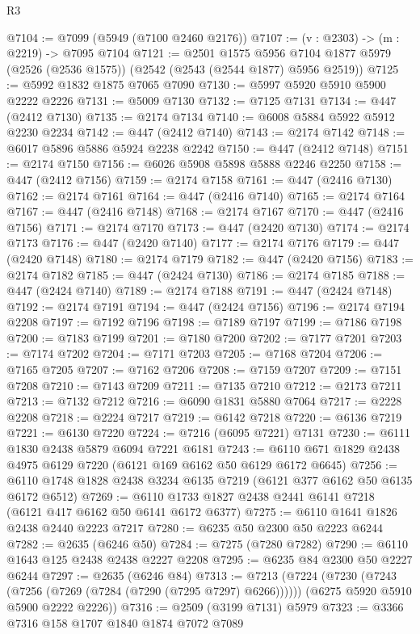 \begin{lexlean}{R3}
\begin{coremodule}
@7104 := @7099 (@5949 (@7100 @2460 @2176))
@7107 := (v : @2303) -> (m : @2219) -> @7095 @7104
@7121 := @2501
    @1575
    @5956
    @7104
    @1877
    @5979
    (@2526 (@2536 @1575))
    (@2542 (@2543 (@2544 @1877) @5956 @2519))
@7125 := @5992 @1832 @1875 @7065 @7090
@7130 := @5997 @5920 @5910 @5900 @2222 @2226
@7131 := @5009 @7130
@7132 := @7125 @7131
@7134 := @447 (@2412 @7130)
@7135 := @2174 @7134
@7140 := @6008 @5884 @5922 @5912 @2230 @2234
@7142 := @447 (@2412 @7140)
@7143 := @2174 @7142
@7148 := @6017 @5896 @5886 @5924 @2238 @2242
@7150 := @447 (@2412 @7148)
@7151 := @2174 @7150
@7156 := @6026 @5908 @5898 @5888 @2246 @2250
@7158 := @447 (@2412 @7156)
@7159 := @2174 @7158
@7161 := @447 (@2416 @7130)
@7162 := @2174 @7161
@7164 := @447 (@2416 @7140)
@7165 := @2174 @7164
@7167 := @447 (@2416 @7148)
@7168 := @2174 @7167
@7170 := @447 (@2416 @7156)
@7171 := @2174 @7170
@7173 := @447 (@2420 @7130)
@7174 := @2174 @7173
@7176 := @447 (@2420 @7140)
@7177 := @2174 @7176
@7179 := @447 (@2420 @7148)
@7180 := @2174 @7179
@7182 := @447 (@2420 @7156)
@7183 := @2174 @7182
@7185 := @447 (@2424 @7130)
@7186 := @2174 @7185
@7188 := @447 (@2424 @7140)
@7189 := @2174 @7188
@7191 := @447 (@2424 @7148)
@7192 := @2174 @7191
@7194 := @447 (@2424 @7156)
@7196 := @2174 @7194 @2208
@7197 := @7192 @7196
@7198 := @7189 @7197
@7199 := @7186 @7198
@7200 := @7183 @7199
@7201 := @7180 @7200
@7202 := @7177 @7201
@7203 := @7174 @7202
@7204 := @7171 @7203
@7205 := @7168 @7204
@7206 := @7165 @7205
@7207 := @7162 @7206
@7208 := @7159 @7207
@7209 := @7151 @7208
@7210 := @7143 @7209
@7211 := @7135 @7210
@7212 := @2173 @7211
@7213 := @7132 @7212
@7216 := @6090 @1831 @5880 @7064
@7217 := @2228 @2208
@7218 := @2224 @7217
@7219 := @6142 @7218
@7220 := @6136 @7219
@7221 := @6130 @7220
@7224 := @7216 (@6095 @7221) @7131
@7230 := @6111 @1830 @2438 @5879 @6094 @7221 @6181
@7243 := @6110 @671 @1829 @2438 @4975 @6129 @7220 (@6121 @169 @6162 @50 @6129 @6172 @6645)
@7256 := @6110 @1748 @1828 @2438 @3234 @6135 @7219 (@6121 @377 @6162 @50 @6135 @6172 @6512)
@7269 := @6110 @1733 @1827 @2438 @2441 @6141 @7218 (@6121 @417 @6162 @50 @6141 @6172 @6377)
@7275 := @6110 @1641 @1826 @2438 @2440 @2223 @7217
@7280 := @6235 @50 @2300 @50 @2223 @6244
@7282 := @2635 (@6246 @50)
@7284 := @7275 (@7280 @7282)
@7290 := @6110 @1643 @125 @2438 @2438 @2227 @2208
@7295 := @6235 @84 @2300 @50 @2227 @6244
@7297 := @2635 (@6246 @84)
@7313 := @7213
    (@7224
      (@7230 (@7243 (@7256 (@7269 (@7284 (@7290 (@7295 @7297) @6266))))))
      (@6275 @5920 @5910 @5900 @2222 @2226))
@7316 := @2509 (@3199 @7131) @5979
@7323 := @3366 @7316 @158 @1707 @1840 @1874 @7072 @7089

\end{coremodule}
\end{lexlean}
